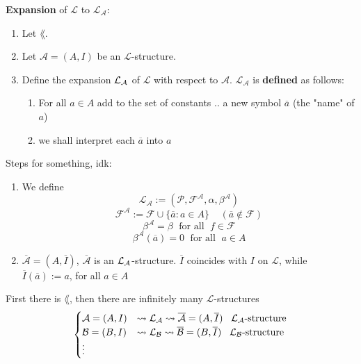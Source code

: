 \textbf{Expansion} of $\mathcal{L}$ to $\mathcal{L}_\mathcal{A}$:
\begin{enumerate}
	\item Let $\lang$.\\
	
	\item Let $\mathcal{A} = (A,I)$ be an $\mathcal{L}$-structure.\\
	
	\item Define the expansion $\mathcal{L}_\mathcal{A}$ of $\mathcal{L}$ with respect to $\mathcal{A}$. $\mathcal{L}_\mathcal{A}$ is \textbf{defined} as follows: 
	\begin{enumerate}
		\item For all $a \in A$ add to the set of constants .. a new symbol $\overline a$ (the "name" of $a$)
		\item we shall interpret each $\overline a$ into $a$
	\end{enumerate} \nn
\end{enumerate}

\newpage

Steps for something, idk:
\begin{enumerate}
	\item We define
	$$ \mathcal{L}_\mathcal{A} := (\mathcal{P}, \mathcal{F}^\mathcal{A}, \alpha, \beta^\mathcal{A}) $$
	$$ \mathcal{F}^\mathcal{A} := \mathcal{F} \cup \{\overline a: a \in A\} \;\;\;\; (\overline a \notin \mathcal{F}) $$
	$$ \beta^\mathcal{A} = \beta \; \text{ for all } \;  f \in \mathcal{F} $$
	$$ \beta^\mathcal{A}(\overline a) = 0 \; \text{ for all }\; a \in A $$
	
	\item $\overline{\mathcal{A}} = (A, \overline I)$, $\overline{\mathcal{A}}$ is an $\mathcal{L}_\mathcal{A}$-structure. $\overline I$ coincides with $I$ on $\mathcal{L}$, while $\overline{I} (\overline a) := a$, for all $a \in A$
\end{enumerate}

First there is $\lang$, then there are infinitely many $\mathcal{L}$-structures
$$
\begin{cases}
	\mathcal{A} = (A,I) & \rightsquigarrow \mathcal{L}_\mathcal{A} \rightsquigarrow \overline{\mathcal{A}} = (A, \overline I) \;\;\; \mathcal{L}_\mathcal{A} \text{-structure} \\
	\mathcal{B} = (B, I) & \rightsquigarrow \mathcal{L}_\mathcal{B} \rightsquigarrow \overline{\mathcal{B}} = (B, \overline{I}) \; \; \; \mathcal{L}_\mathcal{B} \text{-structure} \\
	\vdots & \\
\end{cases}
$$

